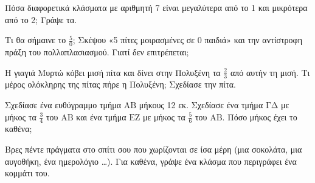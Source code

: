 \ex Πόσα διαφορετικά κλάσματα με αριθμητή 7 είναι μεγαλύτερα από το 1 και μικρότερα από το 2; Γράψε τα.

\ex Τι θα σήμαινε το $\frac{5}{0}$; Σκέψου «5 πίτες μοιρασμένες σε 0 παιδιά» και την αντίστροφη πράξη του πολλαπλασιασμού. Γιατί δεν επιτρέπεται;

\ex Η γιαγιά Μυρτώ κόβει μισή πίτα και δίνει στην Πολυξένη τα $\frac{2}{3}$ από αυτήν τη μισή. Τι μέρος ολόκληρης της πίτας πήρε η Πολυξένη; Σχεδίασε την πίτα.


\ex Σχεδίασε ένα ευθύγραμμο τμήμα $\mathrm{ΑΒ}$ μήκους 12 εκ. Σχεδίασε ένα τμήμα $\mathrm{ΓΔ}$ με μήκος τα $\frac{3}{4}$ του $\mathrm{ΑΒ}$ και ένα τμήμα $\mathrm{ΕΖ}$ με μήκος τα $\frac{5}{6}$ του $\mathrm{ΑΒ}$. Πόσο μήκος έχει το καθένα;

\ex Βρες πέντε πράγματα στο σπίτι σου που χωρίζονται σε ίσα μέρη (μια σοκολάτα, μια αυγοθήκη, ένα ημερολόγιο \dots). Για καθένα, γράψε ένα κλάσμα που περιγράφει ένα κομμάτι του.

